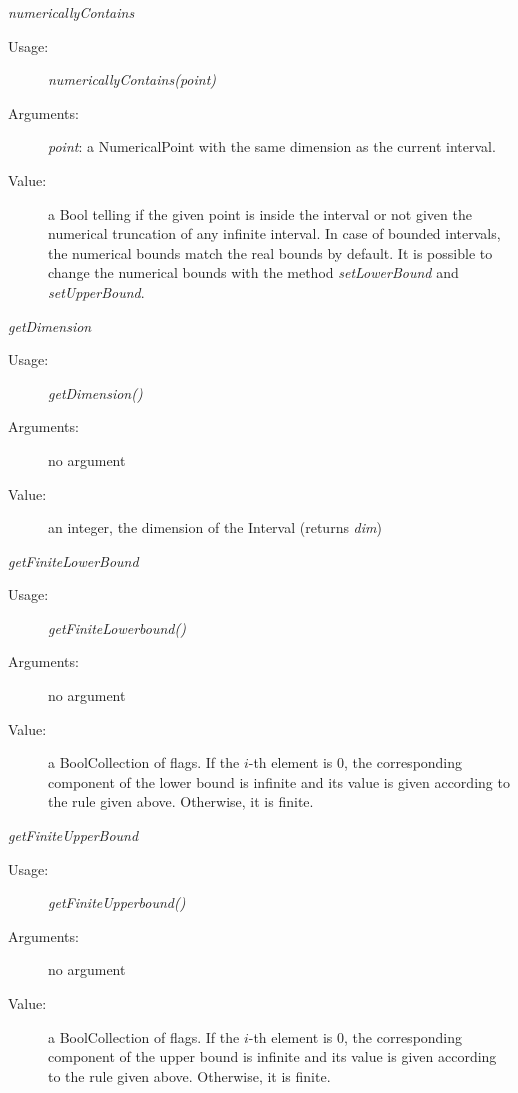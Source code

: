 \begin{description}
\begin{description}
\item \textit{numericallyContains}
\begin{description}
\item[Usage:] \textit{numericallyContains(point)}
\item[Arguments:] \textit{point}: a NumericalPoint with the same dimension as the current interval.
\item[Value:] a Bool telling if the given point is inside the interval or not given the numerical truncation of any infinite interval. In case of bounded intervals, the numerical bounds match the real bounds by default. It is possible to change the numerical bounds with the method \emph{setLowerBound} and \emph{setUpperBound}.
\end{description}
\bigskip

\item \textit{getDimension}
\begin{description}
\item[Usage:] \textit{getDimension()}
\item[Arguments:] no argument
\item[Value:]  an integer, the dimension of the Interval (returns \textit{dim})
\end{description}
\bigskip

\item \textit{getFiniteLowerBound}
\begin{description}
\item[Usage:] \textit{getFiniteLowerbound()}
\item[Arguments:] no argument
\item[Value:] a BoolCollection of flags. If the $i$-th element is 0, the corresponding component of the lower bound is infinite and its value is given according to the rule given above. Otherwise, it is finite.
\end{description}
\bigskip

\item \textit{getFiniteUpperBound}
\begin{description}
\item[Usage:] \textit{getFiniteUpperbound()}
\item[Arguments:] no argument
\item[Value:] a BoolCollection of flags. If the $i$-th element is 0, the corresponding component of the upper bound is infinite and its value is given according to the rule given above. Otherwise, it is finite.
\end{description}
\bigskip


\end{description}
\end{description}
